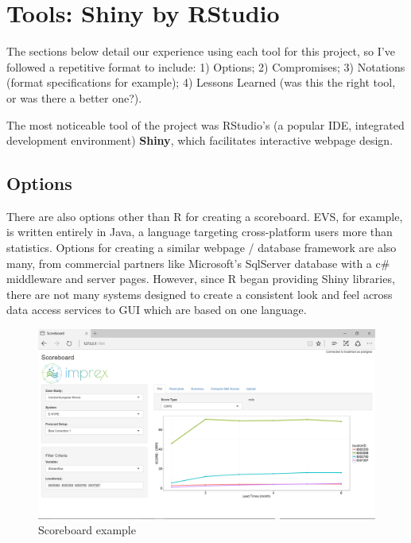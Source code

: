 \documentclass[logos,parttoc,morelanguage=french,morelanguage=german]{orsay-memoire}
\begin{document}
\section{Tools: Shiny by RStudio}

The sections below detail our experience using each tool for this project, so I've followed a repetitive format to include: 1) Options; 2) Compromises; 3) Notations (format specifications for example); 4) Lessons Learned (was this the right tool, or was there a better one?).

The most noticeable tool of the project was RStudio's (a popular IDE, integrated development environment) \textbf{Shiny}, which facilitates interactive webpage design.

\subsection{Options}

There are also options other than R for creating a scoreboard. EVS, for example, is written entirely in Java, a language targeting cross-platform users more than statistics. Options for creating a similar webpage / database framework are also many, from commercial partners like Microsoft's SqlServer database with a c\# middleware and server pages. However, since R began providing Shiny libraries, there are not many systems designed to create a consistent look and feel across data access services to GUI which are based on one language.


\begin{figure}[ht]
\centering
\includegraphics[width=\linewidth]{images/shinPlotCRPS.png}
  \caption{Scoreboard example}
  \label{fig:scoreboard example}
\end{figure}
\end{document}
